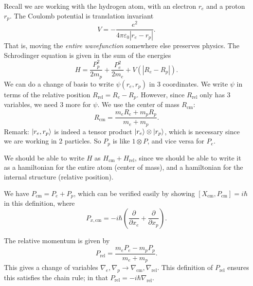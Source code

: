 Recall we are working with the hydrogen atom, with an electron $r_e$ and a proton $r_p$. The Coulomb potential is translation invariant
\[
	V=- \frac{e^2}{4\pi \varepsilon _0\left| r_e-r_p \right| } 
.\]
That is, moving the \emph{entire wavefunction} somewhere else preserves physics. The Schrodinger equation is given in the sum of the energies
\[
	H=\frac{P^2_p}{2m_p} +\frac{P^2_e}{2m_e} +V(|R_e-R_p|)
.\]
We can do a change of basis to write $\psi (r_e,r_p)$ in 3 coordinates. We write $\psi $ in terms of the relative position $R_{\text{rel} } =R_e-R_p$. However, since $R_{\text{rel} } $ only has 3 variables, we need 3 more for $\psi $. We use the center of mass $R_{\text{cm} } $:
\[
	R_{\text{cm} } =\frac{m_eR_e+m_pR_p}{m_e+m_p} 
.\]
Remark: $\lvert r_e,r_p\rangle $ is indeed a tensor product $\lvert r_e\rangle \otimes \lvert r_p\rangle $, which is necessary since we are working in 2 particles. So $P_p$ is like $1\otimes P$, and vice versa for $P_e$.

We should be able to write $H$ as $H_{\text{cm} } +H_{\text{rel} } $, since we should be able to write it as a hamiltonian for the entire atom (center of mass), and a hamiltonian for the internal structure (relative position).

We have $P_{\text{cm} } =P_e+P_p$, which can be verified easily by showing $\left[ X_{\text{cm} } ,P_{\text{cm} }  \right] =i\hbar $ in this definition, where
\[
	P_{x,\text{cm} } =-i\hbar \left( \frac{\partial }{\partial x_e} +\frac{\partial }{\partial x_p}  \right) 
.\]

The relative momentum is given by
\[
	P_{\text{rel} } =\frac{m_eP_e-m_pP_p}{m_e+m_p} 
.\]
This gives a change of variables $\nabla_e,\nabla _p \to \nabla_{\text{cm} } ,\nabla_{\text{rel} } $. This definition of $P_{\text{rel} } $ ensures this satisfies the chain rule; in that $P_{\text{rel} } =-i\hbar \nabla_{\text{rel} } $.

